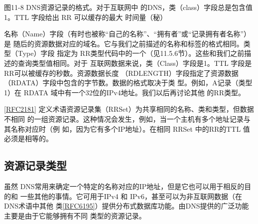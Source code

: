 图11-8 DNS资源记录的格式。对于互联网中
的DNS，类（class）字段总是包含值
1。TTL 字段给出 RR 可以缓存的最大
时间量（秘）

名称（Name）字段（有时也被称“自己的名称”、“拥有者”或“记录拥有者名称”）是
随后的资源数据对应的域名。它与我们之前描述的名称和标签的格式相同。类型（Type）字段
指定为 RR类型代码中的一个（见11.5.6节）。这些和我们之前描述的查询类型值相同。对于
互联网数据来说，类（Class）字段是1。TTL 字段是RR可以被缓存的秒数。资源数据长度
（RDLENGTH）字段指定了资源数据（RDATA）字段中包含的字节数。数据的格式取决于类
型。例如，A记录（类型1）在 RDATA 域中有一个32位的IPv4地址。我们以后再讨论其他
的RR类型。

\href{https://www.rfc-editor.org/rfc/rfc2181}{[RFC2181]}
定义术语资源记录集（RRSet）为共享相同的名称、类和类型，但数据不相同
的一组资源记录。这种情况会发生，例如，当一个主机有多个地址记录与其名称对应时（例
如，因为它有多个IP地址）。在相同 RRSet 中的RR的TTL 值必须是相等的。

\subsection{资源记录类型}

虽然 DNS常用来确定一个特定的名称对应的IP地址，但是它也可以用于相反的目的和
一些其他的事情。它可用于IPv4 和 IPv6，甚至可以为非互联网数据（在 DNS术语中其他
类\href{https://www.rfc-editor.org/rfc/rfc6195}{[RFC6195]}）提供分布式数据库功能。由DNS提供的广泛功能主要是由于它能够拥有不同
类型的资源记录。

